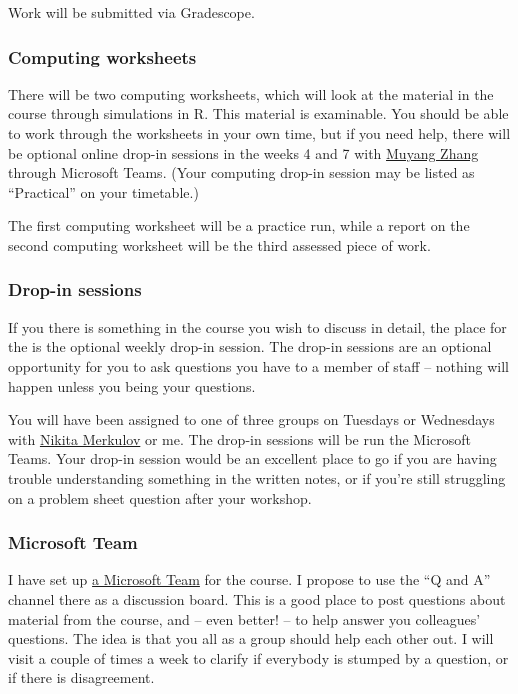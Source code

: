 \documentclass[
  a4paper,
]{article}
\theoremstyle{definition}
\theoremstyle{definition}
\theoremstyle{definition}
\theoremstyle{remark}
\begin{document}
Work will be submitted via Gradescope.

\hypertarget{about-computing}{%
\subsubsection*{Computing worksheets}\label{about-computing}}

There will be two computing worksheets, which will look at the material in the course through simulations in R. This material is examinable. You should be able to work through the worksheets in your own time, but if you need help, there will be optional online drop-in sessions in the weeks 4 and 7 with \href{https://eps.leeds.ac.uk/maths/pgr/6422/muyang-zhang}{Muyang Zhang} through Microsoft Teams. (Your computing drop-in session may be listed as ``Practical'' on your timetable.)

The first computing worksheet will be a practice run, while a report on the second computing worksheet will be the third assessed piece of work.

\hypertarget{dropin}{%
\subsubsection*{Drop-in sessions}\label{dropin}}

If you there is something in the course you wish to discuss in detail, the place for the is the optional weekly drop-in session. The drop-in sessions are an optional opportunity for you to ask questions you have to a member of staff -- nothing will happen unless you being your questions.

You will have been assigned to one of three groups on Tuesdays or Wednesdays with \href{https://eps.leeds.ac.uk/maths/pgr/4992/nikita-merkulov}{Nikita Merkulov} or me. The drop-in sessions will be run the Microsoft Teams. Your drop-in session would be an excellent place to go if you are having trouble understanding something in the written notes, or if you're still struggling on a problem sheet question after your workshop.

\hypertarget{team}{%
\subsubsection*{Microsoft Team}\label{team}}

I have set up \href{https://teams.microsoft.com/l/channel/19\%3a8cb8008c95204bbeaefa8ee7d48c1a13\%40thread.tacv2/General?groupId=1c138eac-0c54-43b0-9d20-d4cf3d65c40a\&tenantId=bdeaeda8-c81d-45ce-863e-5232a535b7cb}{a Microsoft Team} for the course. I propose to use the ``Q and A'' channel there as a discussion board. This is a good place to post questions about material from the course, and -- even better! -- to help answer you colleagues' questions. The idea is that you all as a group should help each other out. I will visit a couple of times a week to clarify if everybody is stumped by a question, or if there is disagreement.
\end{document}
